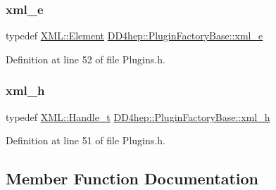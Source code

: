 \hypertarget{struct_d_d4hep_1_1_plugin_factory_base_a4fd06e29fc55de37e856b2a72831d50e}{}\label{struct_d_d4hep_1_1_plugin_factory_base_a4fd06e29fc55de37e856b2a72831d50e} 
\subsubsection{\texorpdfstring{xml\+\_\+e}{xml\_e}}
{\footnotesize\ttfamily typedef \hyperlink{class_d_d4hep_1_1_x_m_l_1_1_element}{X\+M\+L\+::\+Element} \hyperlink{struct_d_d4hep_1_1_plugin_factory_base_a4fd06e29fc55de37e856b2a72831d50e}{D\+D4hep\+::\+Plugin\+Factory\+Base\+::xml\+\_\+e}}



Definition at line 52 of file Plugins.\+h.

\hypertarget{struct_d_d4hep_1_1_plugin_factory_base_aedebe6835e2705756763812545bcb8fd}{}\label{struct_d_d4hep_1_1_plugin_factory_base_aedebe6835e2705756763812545bcb8fd} 
\subsubsection{\texorpdfstring{xml\+\_\+h}{xml\_h}}
{\footnotesize\ttfamily typedef \hyperlink{class_d_d4hep_1_1_x_m_l_1_1_handle__t}{X\+M\+L\+::\+Handle\+\_\+t} \hyperlink{struct_d_d4hep_1_1_plugin_factory_base_aedebe6835e2705756763812545bcb8fd}{D\+D4hep\+::\+Plugin\+Factory\+Base\+::xml\+\_\+h}}



Definition at line 51 of file Plugins.\+h.



\subsection{Member Function Documentation}
\hypertarget{struct_d_d4hep_1_1_plugin_factory_base_aba8cd2aea2aac182a69fdb751d5f20d6}{}\label{struct_d_d4hep_1_1_plugin_factory_base_aba8cd2aea2aac182a69fdb751d5f20d6} 
